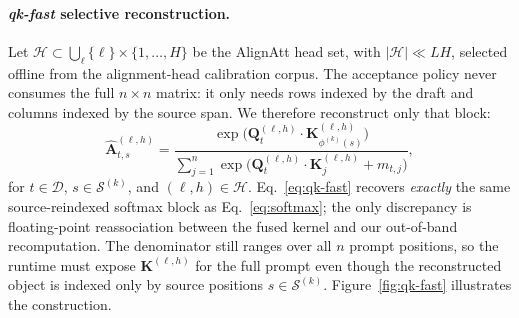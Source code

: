 \documentclass[11pt,twocolumn]{article}
\begin{document}
\paragraph{\emph{qk-fast} selective reconstruction.}
Let $\mathcal{H} \subset \bigcup_\ell \{\ell\} \times \{1,\ldots,H\}$ be the
AlignAtt head set, with $|\mathcal{H}| \ll LH$, selected offline from the
alignment-head calibration corpus. The acceptance policy never consumes the
full $n \times n$ matrix: it only needs rows indexed by the draft and columns
indexed by the source span. We therefore reconstruct only that block:
\begin{equation}
  \widehat{\mathbf{A}}^{(\ell,h)}_{t,s}
  = \frac{\exp\!\bigl(\mathbf{Q}^{(\ell,h)}_t \!\cdot\! \mathbf{K}^{(\ell,h)}_{\phi^{(k)}(s)}\bigr)}
       {\sum_{j=1}^{n} \exp\!\bigl(\mathbf{Q}^{(\ell,h)}_t \!\cdot\! \mathbf{K}^{(\ell,h)}_j + m_{t,j}\bigr)},
  \label{eq:qk-fast}
\end{equation}
for $t \in \mathcal{D}$, $s \in \mathcal{S}^{(k)}$, and $(\ell,h) \in \mathcal{H}$.
Eq.~\eqref{eq:qk-fast} recovers \emph{exactly} the same source-reindexed
softmax block as Eq.~\eqref{eq:softmax}; the only discrepancy is floating-point
reassociation between the fused kernel and our out-of-band recomputation. The
denominator still ranges over all $n$ prompt positions, so the runtime must
expose $\mathbf{K}^{(\ell,h)}$ for the full prompt even though the reconstructed
object is indexed only by source positions $s \in \mathcal{S}^{(k)}$.
Figure~\ref{fig:qk-fast} illustrates the construction.
\end{document}
